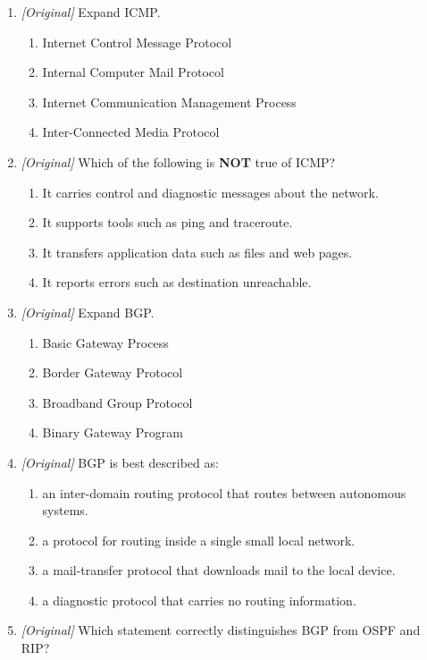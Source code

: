 \documentclass[11pt]{article}
\begin{document}
\begin{enumerate}[label=\textbf{Q\arabic*.}, leftmargin=*]
\item \textit{[Original]} Expand ICMP.
  \begin{enumerate}[label=\Alph*.]
    \item Internet Control Message Protocol
    \item Internal Computer Mail Protocol
    \item Internet Communication Management Process
    \item Inter-Connected Media Protocol
  \end{enumerate}
\item \textit{[Original]} Which of the following is \textbf{NOT} true of ICMP?
  \begin{enumerate}[label=\Alph*.]
    \item It carries control and diagnostic messages about the network.
    \item It supports tools such as ping and traceroute.
    \item It transfers application data such as files and web pages.
    \item It reports errors such as destination unreachable.
  \end{enumerate}
\item \textit{[Original]} Expand BGP.
  \begin{enumerate}[label=\Alph*.]
    \item Basic Gateway Process
    \item Border Gateway Protocol
    \item Broadband Group Protocol
    \item Binary Gateway Program
  \end{enumerate}
\item \textit{[Original]} BGP is best described as:
  \begin{enumerate}[label=\Alph*.]
    \item an inter-domain routing protocol that routes between autonomous
      systems.
    \item a protocol for routing inside a single small local network.
    \item a mail-transfer protocol that downloads mail to the local device.
    \item a diagnostic protocol that carries no routing information.
  \end{enumerate}
\item \textit{[Original]} Which statement correctly distinguishes BGP from
  OSPF and RIP?
  \begin{enumerate}[label=\Alph*.]

\end{enumerate}
\end{enumerate}
\end{document}
